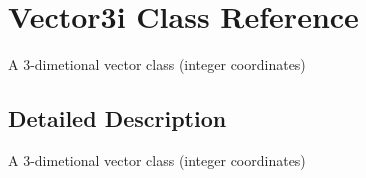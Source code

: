 \hypertarget{class_vector3i}{\section{Vector3i Class Reference}
\label{class_vector3i}
}


A 3-\/dimetional vector class (integer coordinates)  




\subsection{Detailed Description}
A 3-\/dimetional vector class (integer coordinates) 
